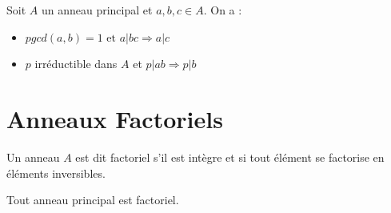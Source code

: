 \begin{theorem}[Gauss]
    Soit $A$ un anneau principal et $a,b,c \in A$. On a :
    \begin{itemize}
        \item $ pgcd(a,b) = 1 \text{ et } a | bc \Longrightarrow a | c $ 
        \item $p$ irréductible dans $A$ et $ p | ab \Longrightarrow p | b $ 
    \end{itemize}
\end{theorem}


\section{Anneaux Factoriels}

\begin{definition}
    Un anneau $A$ est dit factoriel s'il est intègre et si tout élément se factorise en éléments inversibles. 
\end{definition}

\begin{theorem}
    Tout anneau principal est factoriel. 
\end{theorem}

